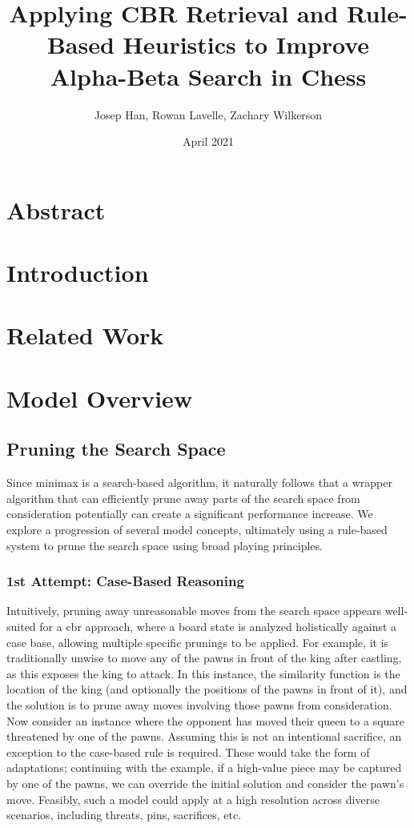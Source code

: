 \documentclass[letterpaper]{article}
\title{Applying CBR Retrieval and Rule-Based Heuristics to Improve Alpha-Beta Search in Chess}
\author{Josep Han, Rowan Lavelle, Zachary Wilkerson}
\date{April 2021}
\begin{document}
\maketitle
\section{Abstract}
\section{Introduction}
\section{Related Work}
\section{Model Overview}

\subsection{Pruning the Search Space}
Since minimax is a search-based algorithm, it naturally follows that a wrapper algorithm that can efficiently prune away parts of the search space from consideration potentially can create a significant performance increase.  We explore a progression of several model concepts, ultimately using a rule-based system to prune the search space using broad playing principles.

\subsubsection{1st Attempt: Case-Based Reasoning}
Intuitively, pruning away unreasonable moves from the search space appears well-suited for a \acrshort{cbr} approach, where a board state is analyzed holistically against a case base, allowing multiple specific prunings to be applied.  For example, it is traditionally unwise to move any of the pawns in front of the king after castling, as this exposes the king to attack.  In this instance, the similarity function is the location of the king (and optionally the positions of the pawns in front of it), and the solution is to prune away moves involving those pawns from consideration.  Now consider an instance where the opponent has moved their queen to a square threatened by one of the pawns.  Assuming this is not an intentional sacrifice, an exception to the case-based rule is required.  These would take the form of adaptations; continuing with the example, if a high-value piece may be captured by one of the pawns, we can override the initial solution and consider the pawn's move.  Feasibly, such a model could apply at a high resolution across diverse scenarios, including threats, pins, sacrifices, etc.
\end{document}
